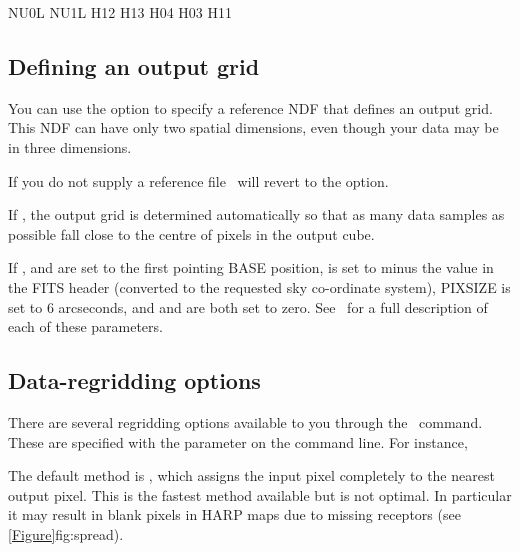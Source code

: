 \documentclass[11pt,oneside,chapters]{starlink}
\begin{document}
\begin{terminalv}
NU0L NU1L
H12 H13 H04 H03 H11
\end{terminalv}


\subsection{Defining an output grid}
\label{sec:outputgrid}
You can use the  option to specify a reference NDF that
defines an output grid. This NDF can have only two spatial dimensions,
even though your data may be in three dimensions.
\begin{terminalv}
\end{terminalv}

If you do not supply a reference file \makecube\ will revert to the
 option.

If , the output grid is determined automatically
so that as many data samples as possible fall close to the centre of
pixels in the output cube.

If ,  and  are set to
the first pointing BASE position,  is set to minus the
 value in the FITS header (converted to the requested
sky co-ordinate system), PIXSIZE is set to 6 arcseconds, and
 and  are both set to zero. See
\smurfsun\ for a full description of each of these parameters.

\subsection{Data-regridding options}
\label{sec:gridding}

There are several regridding options available to you through the
\makecube\ command. These are specified with the 
parameter on the command line.  For instance,
\begin{terminalv}
\end{terminalv}

The default method is , which assigns the input pixel
completely to the nearest output pixel. This is the fastest method
available but is not optimal. In particular it may result in blank
pixels in HARP maps due to missing receptors (see
\cref{Figure}{fig:spread}{}).
\end{document}
